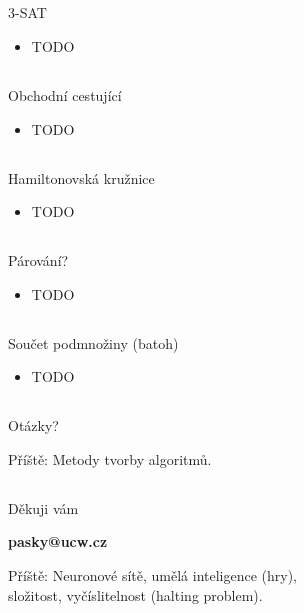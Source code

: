 \documentclass{beamer}
\begin{document}
\subsection{}
\begin{frame}{3-SAT}
\begin{itemize}
\item TODO
\end{itemize}
\end{frame}

\subsection{}
\begin{frame}{Obchodní cestující}
\begin{itemize}
\item TODO
\end{itemize}
\end{frame}

\subsection{}
\begin{frame}{Hamiltonovská kružnice}
\begin{itemize}
\item TODO
\end{itemize}
\end{frame}

\subsection{}
\begin{frame}{Párování?}
\begin{itemize}
\item TODO
\end{itemize}
\end{frame}

\subsection{}
\begin{frame}{Součet podmnožiny (batoh)}
\begin{itemize}
\item TODO
\end{itemize}
\end{frame}

\subsection{}
\begin{frame}{Otázky?}
\begin{center}
Příště: Metody tvorby algoritmů.
\end{center}
\end{frame}

\subsection{}
\begin{frame}{Děkuji vám}
\begin{center}
{\bf pasky@ucw.cz}

Příště: Neuronové sítě, umělá inteligence (hry), \\ složitost, vyčíslitelnost (halting problem).
\end{center}
\end{frame}
\end{document}
